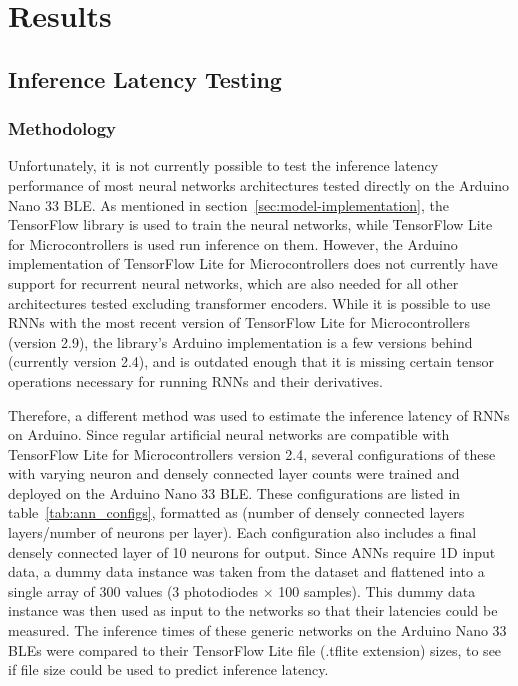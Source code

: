 \section{Results}\label{sec:results}
\subsection{Inference Latency Testing}\label{subsec:inference-latency-testing}
\subsubsection{Methodology}
Unfortunately, it is not currently possible to test the inference latency performance of most neural networks architectures tested directly on the Arduino Nano 33 BLE\@.
As mentioned in section~\ref{sec:model-implementation}, the TensorFlow library is used to train the neural networks, while TensorFlow Lite for Microcontrollers is used run inference on them.
However, the Arduino implementation of TensorFlow Lite for Microcontrollers does not currently have support for recurrent neural networks, which are also needed for all other architectures tested excluding transformer encoders.
While it is possible to use RNNs with the most recent version of TensorFlow Lite for Microcontrollers (version 2.9), the library's Arduino implementation is a few versions behind (currently version 2.4), and is outdated enough that it is missing certain tensor operations necessary for running RNNs and their derivatives.

Therefore, a different method was used to estimate the inference latency of RNNs on Arduino.
Since regular artificial neural networks are compatible with TensorFlow Lite for Microcontrollers version 2.4, several configurations of these with varying neuron and densely connected layer counts were trained and deployed on the Arduino Nano 33 BLE\@.
These configurations are listed in table~\ref{tab:ann_configs}, formatted as (number of densely connected layers layers/number of neurons per layer).
Each configuration also includes a final densely connected layer of 10 neurons for output.
Since ANNs require 1D input data, a dummy data instance was taken from the dataset and flattened into a single array of 300 values (3 photodiodes $\times$ 100 samples).
This dummy data instance was then used as input to the networks so that their latencies could be measured.
The inference times of these generic networks on the Arduino Nano 33 BLEs were compared to their TensorFlow Lite file (.tflite extension) sizes, to see if file size could be used to predict inference latency.

